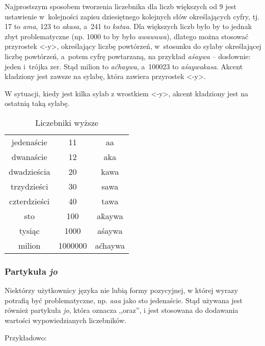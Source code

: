 \begin{spacing}{1.1}
Najprostszym sposobem tworzenia liczebnika dla liczb większych od 9 jest
ustawienie w~kolejności zapisu dziesiętnego kolejnych słów określających cyfry,
tj. 17 to \emph{ama}, 123 to \emph{akasa}, a~241 to \emph{kataa}. Dla większych
liczb było by to jednak zbyt problematyczne (np. 1000 to by było
\emph{awawawa}), dlatego można stosować przyrostek <-y>, określający liczbę
powtórzeń, w~stosunku do sylaby określającej liczbę powtórzeń, a~potem cyfrę
powtarzaną, na przykład \emph{aśaywa} -- dosłownie: jeden i~trójka zer. Stąd
milion to \emph{aćhaywa}, a~100023 to \emph{aśaywakasa}. Akcent kładziony jest
zawsze na sylabę, która zawiera przyrostek <-y>.

W sytuacji, kiedy jest kilka sylab z wrostkiem <-y>, akcent kładziony jest na
ostatnią taką sylabę.

\begin{table}[ht]
	\centering
	\caption{Liczebniki wyższe}
	\begin{tabular}{ccc} \toprule
		jedenaście & 11 & aa \\
		dwanaście & 12 & aka \\
		dwadzieścia & 20 & kawa \\
		trzydzieści & 30 & sawa \\
		czterdzieści & 40 & tawa \\
		sto & 100 & aḱaywa  \\
		tysiąc & 1000 & aśaywa \\
		milion & 1000000 & aćhaywa \\\bottomrule
	\end{tabular}
	\label{tab:numerals2}
\end{table}

\subsubsection{Partykuła \emph{jo}}

Niektórzy użytkownicy języka nie lubią formy pozycyjnej, w której wyrazy
potrafią być problematyczne, np. \emph{aaa} jako sto jedenaście. Stąd używana
jest również partykuła \emph{jo}, która oznacza ,,oraz'', i jest stosowana do
dodawania wartości wypowiedzianych liczebników.

Przykładowo:





\end{spacing}
